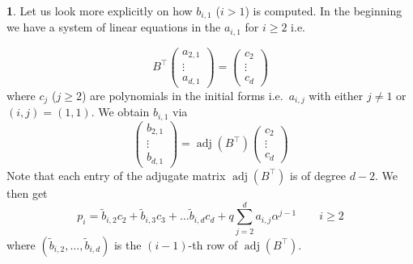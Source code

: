 \documentclass[a4paper,11pt]{amsart}%
\newcommand\adj{\operatorname{adj}}
\newcommand\pmat[1]{\begin{pmatrix} #1 \end{pmatrix}}
\theoremstyle{definition}
\newtheorem{none}[theorem]{}
\begin{document}
\begin{none}
Let us look more explicitly on how $b_{i,1}$ ($i>1$) is computed. In the beginning we have a system of linear equations in the 
$a_{i,1}$ for $i\ge 2$ i.e.

\begin{equation}\label{Bac_eqn}
B^\top\pmat{a_{2,1}\\ \vdots \\a_{d,1}} = \pmat{c_2 \\ \vdots \\ c_d}
\end{equation}
where $c_j$ ($j\ge 2$) are polynomials in the initial forms i.e.\ $a_{i,j}$ with either $j\ne 1$ or $(i,j)=(1,1)$. 
We obtain $b_{i,1}$
via
$$\pmat{b_{2,1}\\ \vdots \\b_{d,1}} =\adj(B^\top)\pmat{c_2 \\ \vdots \\ c_d}$$
Note that each entry of the adjugate matrix $\adj(B^\top)$ is of degree $d-2$. We then get 
\begin{equation}\label{p_and_adj}
p_i = \tilde b_{i,2} c_2 + \tilde b_{i,3} c_3 + \dots \tilde b_{i,d} c_d + q\sum_{j=2}^d a_{i,j}\alpha^{j-1} \qquad i\ge 2
\end{equation}
where $(\tilde b_{i,2} , \dots ,\tilde b_{i,d})$ is the $(i-1)$-th row of $\adj(B^\top)$.
\end{none}
\end{document}
